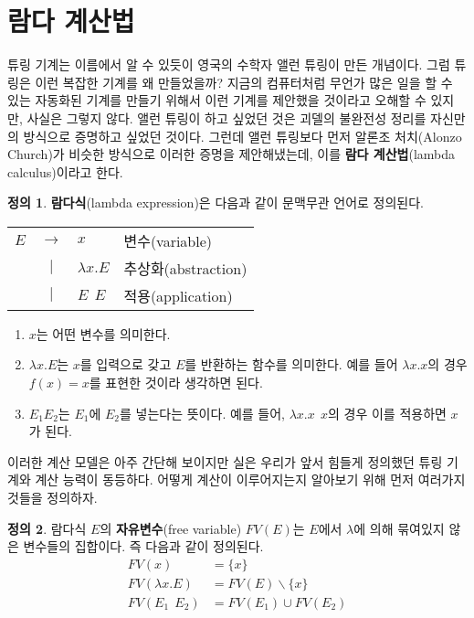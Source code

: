 \documentclass[b5paper, 11pt]{book}
\theoremstyle{definition}
\newtheorem{defn}{정의}[chapter]
\begin{document}
\section{람다 계산법}\label{lambda calculus}
튜링 기계는 이름에서 알 수 있듯이 영국의 수학자 앨런 튜링이 만든 개념이다. 그럼 튜링은 이런 복잡한 기계를 왜 만들었을까? 지금의 컴퓨터처럼 무언가 많은 일을 할 수 있는 자동화된 기계를 만들기 위해서 이런 기계를 제안했을 것이라고 오해할 수 있지만, 사실은 그렇지 않다. 앨런 튜링이 하고 싶었던 것은 괴델의 불완전성 정리를 자신만의 방식으로 증명하고 싶었던 것이다. 그런데 앨런 튜링보다 먼저 알론조 처치(Alonzo Church)가 비슷한 방식으로 이러한 증명을 제안해냈는데, 이를 \textbf{람다 계산법}(lambda calculus)이라고 한다. 
\begin{defn}
    \textbf{람다식}(lambda expression)은 다음과 같이 문맥무관 언어로 정의된다.
    \begin{center}
        \begin{tabular}{ccll}
            $E$ & $\rightarrow$ & $x$ & 변수(variable) \\ 
            & $\vert$ & $\lambda x . E$ & 추상화(abstraction) \\ 
            & $\vert$ & $E \;\, E$ & 적용(application)
        \end{tabular}    
    \end{center}
    \begin{enumerate}
        \item $x$는 어떤 변수를 의미한다.
        \item $\lambda x. E$는 $x$를 입력으로 갖고 $E$를 반환하는 함수를 의미한다. 예를 들어
        $\lambda x . x$의 경우 $f(x) = x$를 표현한 것이라 생각하면 된다.
        \item $E_1 E_2$는 $E_1$에 $E_2$를 넣는다는 뜻이다. 예를 들어, $\lambda x. x \;\, x$의 경우
        이를 적용하면 $x$가 된다.
    \end{enumerate} 
\end{defn}
이러한 계산 모델은 아주 간단해 보이지만 실은 우리가 앞서 힘들게 정의했던 튜링 기계와 계산 능력이 동등하다. 어떻게 계산이 이루어지는지 알아보기 위해 먼저 여러가지 것들을 정의하자.
\begin{defn}
    람다식 $E$의 \textbf{자유변수}(free variable) $FV(E)$는 $E$에서 $\lambda$에 의해 묶여있지 않은 변수들의 집합이다. 즉 다음과 같이 정의된다.
    \begin{align*}
        FV(x) &= \{ x \} \\ 
        FV(\lambda x. E) &= FV(E) \backslash \{x\} \\ 
        FV(E_1 \;\, E_2) &= FV(E_1) \cup FV(E_2) 
    \end{align*}
\end{defn}
\end{document}
